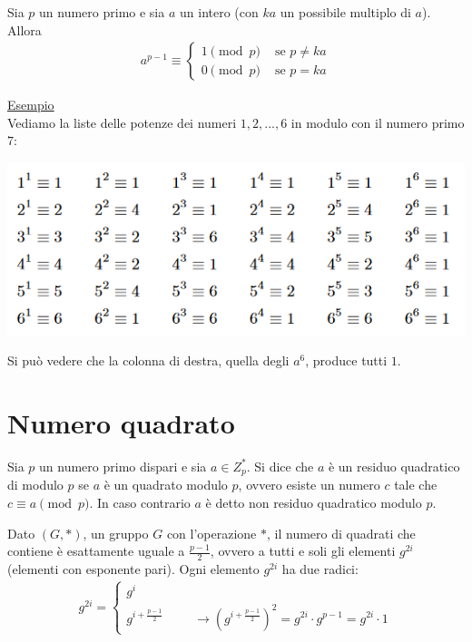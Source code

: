 \begin{theorem}
    Sia \(p\) un numero primo e sia \(a\) un intero (con \(ka\) un possibile multiplo di $a$). Allora
    \begin{align*}
        a^{p-1} \equiv 
        \begin{cases}
                1 \pmod p & \text{ se } p \ne ka\\
                0 \pmod p & \text{ se } p = ka
        \end{cases}
    \end{align*}
\end{theorem}

\noindent \underline{Esempio}\\

\noindent Vediamo la liste delle potenze dei numeri $1, 2, ..., 6$ in modulo con il numero primo $7$:

\begin{center}
     \includegraphics[width=1\textwidth]{images/6.png}
\end{center}

\noindent Si può vedere che la colonna di destra, quella degli $a^{6}$, produce tutti $1$.

\section{Numero quadrato}

\begin{definition}
Sia \(p\) un numero primo dispari e sia $a \in Z^*_p$. Si dice che \(a\) è un residuo quadratico di modulo \(p\) se \(a\) è un quadrato modulo \(p\), ovvero esiste un numero \(c\) tale che \(c \equiv a \pmod p\). In caso contrario \(a\) è detto non residuo quadratico modulo \(p\).
\end{definition}

\noindent Dato $(G, *)$, un gruppo $G$ con l'operazione $*$, il numero di quadrati che contiene è esattamente uguale a $\frac{p-1}{2}$, ovvero a tutti e soli gli elementi $g^{2i}$ (elementi con esponente pari). Ogni elemento $g^{2i}$ ha due radici:
\begin{align*}
 	g^{2i}=
 	    \begin{cases}
 	   g^i \\ 
 	    g^{i+\frac{p-1}{2}} \hspace{1cm} \rightarrow (g^{i+\frac{p-1}{2}})^2 = g^{2i}\cdot g^{p-1} = g^{2i}\cdot 1
        \end{cases} 
\end{align*}

